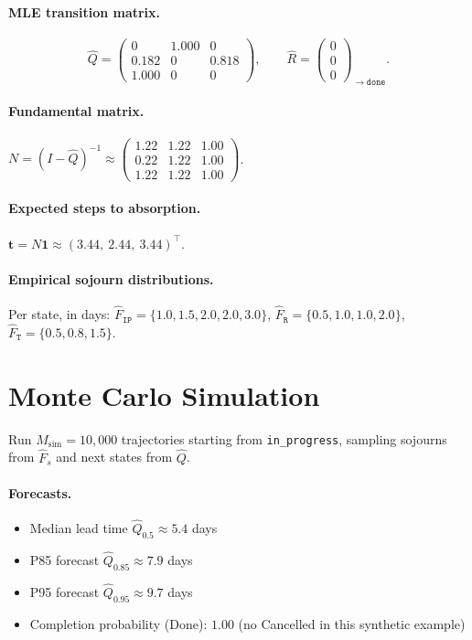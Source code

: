 \paragraph{MLE transition matrix.}
\begin{equation*}
\hat{Q} = \begin{pmatrix}
0    & 1.000 & 0     \\
0.182 & 0    & 0.818 \\
1.000 & 0    & 0
\end{pmatrix},
\qquad
\hat{R} = \begin{pmatrix}
0 \\ 0 \\ 0
\end{pmatrix}_{\to \mathtt{done}}.
\end{equation*}

\paragraph{Fundamental matrix.}
$N = (I - \hat{Q})^{-1} \approx \begin{pmatrix}
1.22 & 1.22 & 1.00 \\
0.22 & 1.22 & 1.00 \\
1.22 & 1.22 & 1.00
\end{pmatrix}$.

\paragraph{Expected steps to absorption.}
$\mathbf{t} = N \mathbf{1} \approx (3.44,\ 2.44,\ 3.44)^\top$.

\paragraph{Empirical sojourn distributions.} Per state, in days:
$\hat{F}_{\mathtt{IP}} = \{1.0, 1.5, 2.0, 2.0, 3.0\}$,
$\hat{F}_{\mathtt{R}}  = \{0.5, 1.0, 1.0, 2.0\}$,
$\hat{F}_{\mathtt{T}}  = \{0.5, 0.8, 1.5\}$.


\section{Monte Carlo Simulation}
\label{app:J-mc}

Run $M_{\mathrm{sim}} = 10{,}000$ trajectories starting from
\texttt{in\_progress}, sampling sojourns from $\hat{F}_s$ and next states
from $\hat{Q}$.

\paragraph{Forecasts.}
\begin{itemize}
  \item Median lead time $\hat{Q}_{0.5} \approx 5.4$ days
  \item P85 forecast $\hat{Q}_{0.85} \approx 7.9$ days
  \item P95 forecast $\hat{Q}_{0.95} \approx 9.7$ days
  \item Completion probability (Done): $1.00$ (no Cancelled in this
    synthetic example)
\end{itemize}

